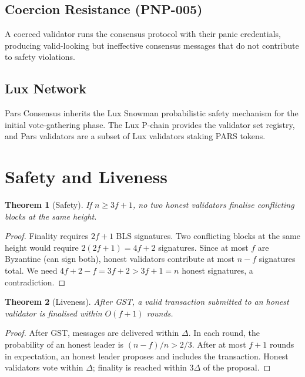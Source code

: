 \documentclass[11pt,a4paper]{article}
\newtheorem{theorem}{Theorem}[section]
\begin{document}
\subsection{Coercion Resistance (PNP-005)}

A coerced validator runs the consensus protocol with their panic
credentials, producing valid-looking but ineffective consensus
messages that do not contribute to safety violations.

\subsection{Lux Network}

Pars Consensus inherits the Lux Snowman probabilistic safety
mechanism for the initial vote-gathering phase.  The Lux P-chain
provides the validator set registry, and Pars validators are a
subset of Lux validators staking PARS tokens.

\section{Safety and Liveness}
\label{sec:proofs}

\begin{theorem}[Safety]
    If $n \geq 3f + 1$, no two honest validators finalise conflicting
    blocks at the same height.
\end{theorem}

\begin{proof}
    Finality requires $2f + 1$ BLS signatures.  Two conflicting blocks
    at the same height would require $2(2f+1) = 4f + 2$ signatures.
    Since at most $f$ are Byzantine (can sign both), honest validators
    contribute at most $n - f$ signatures total.  We need
    $4f + 2 - f = 3f + 2 > 3f + 1 = n$ honest signatures, a
    contradiction.
\end{proof}

\begin{theorem}[Liveness]
    After GST, a valid transaction submitted to an honest validator is
    finalised within $O(f + 1)$ rounds.
\end{theorem}

\begin{proof}
    After GST, messages are delivered within $\Delta$.  In each round,
    the probability of an honest leader is $(n - f)/n > 2/3$.  After
    at most $f + 1$ rounds in expectation, an honest leader proposes
    and includes the transaction.  Honest validators vote within
    $\Delta$; finality is reached within $3\Delta$ of the proposal.
\end{proof}
\end{document}
